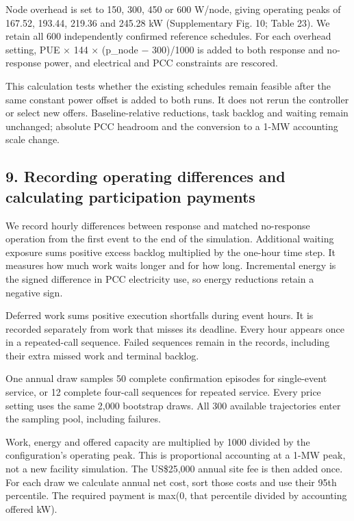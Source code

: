 \documentclass[10pt,a4paper]{article}
\begin{document}
Node overhead is set to 150, 300, 450 or 600 W/node, giving operating peaks of 167.52, 193.44, 219.36 and 245.28 kW (Supplementary Fig. 10; Table 23). We retain all 600 independently confirmed reference schedules. For each overhead setting, PUE × 144 × (p\_node − 300)/1000 is added to both response and no-response power, and electrical and PCC constraints are rescored.


This calculation tests whether the existing schedules remain feasible after the same constant power offset is added to both runs. It does not rerun the controller or select new offers. Baseline-relative reductions, task backlog and waiting remain unchanged; absolute PCC headroom and the conversion to a 1-MW accounting scale change.


\subsection{9. Recording operating differences and calculating participation payments}

We record hourly differences between response and matched no-response operation from the first event to the end of the simulation. Additional waiting exposure sums positive excess backlog multiplied by the one-hour time step. It measures how much work waits longer and for how long. Incremental energy is the signed difference in PCC electricity use, so energy reductions retain a negative sign.


Deferred work sums positive execution shortfalls during event hours. It is recorded separately from work that misses its deadline. Every hour appears once in a repeated-call sequence. Failed sequences remain in the records, including their extra missed work and terminal backlog.


One annual draw samples 50 complete confirmation episodes for single-event service, or 12 complete four-call sequences for repeated service. Every price setting uses the same 2,000 bootstrap draws. All 300 available trajectories enter the sampling pool, including failures.


Work, energy and offered capacity are multiplied by 1000 divided by the configuration's operating peak. This is proportional accounting at a 1-MW peak, not a new facility simulation. The US\$25,000 annual site fee is then added once. For each draw we calculate annual net cost, sort those costs and use their 95th percentile. The required payment is max(0, that percentile divided by accounting offered kW).
\end{document}
